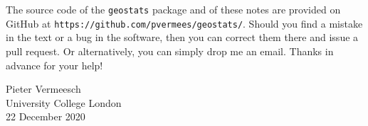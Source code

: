 The source code of the \texttt{geostats} package and of these notes
are provided on GitHub at
\texttt{https://github.com/pvermees/geostats/}.  Should you find a
mistake in the text or a bug in the software, then you can correct
them there and issue a pull request. Or alternatively, you can simply
drop me an email. Thanks in advance for your help!\\

\begin{flushright}
  Pieter Vermeesch\\ University College London\\ 22 December 2020\\
\end{flushright}

